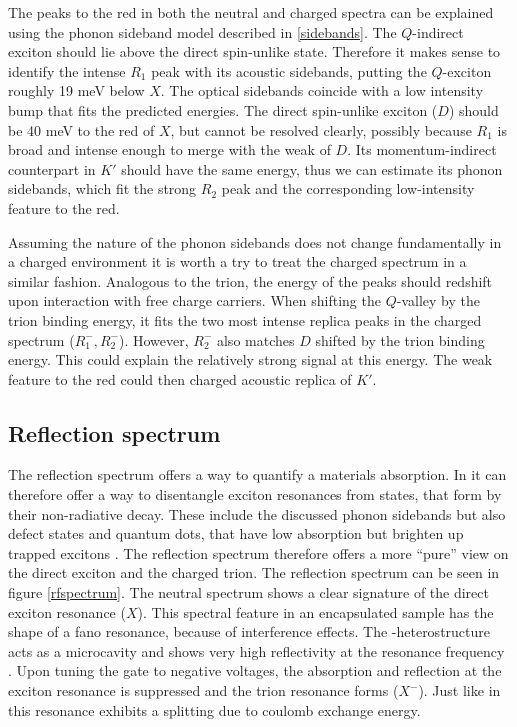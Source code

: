 The peaks to the red in both the neutral and charged spectra can be explained using the phonon sideband model described in \ref{sidebands}. The $Q$-indirect exciton should lie above the direct spin-unlike state. Therefore it makes sense to identify the intense $R_1$ peak with its acoustic sidebands, putting the $Q$-exciton roughly 19  meV below $X$. The optical sidebands coincide with a low intensity bump that fits the predicted energies. The direct spin-unlike exciton ($D$) should be 40 meV to the red of $X$, but cannot be resolved clearly, possibly because $R_1$ is broad and intense enough to merge with the weak \pl of $D$. Its momentum-indirect counterpart in $K'$ should have the same energy, thus we can estimate its phonon sidebands, which fit the strong $R_2$ peak and the corresponding low-intensity feature to the red.

Assuming the nature of the phonon sidebands does not change fundamentally in a charged environment it is worth a try to treat the charged spectrum in a similar fashion. Analogous to the trion, the energy of the peaks should redshift upon interaction with free charge carriers. When shifting the $Q$-valley by the trion binding energy, it fits the two most intense replica peaks in the charged spectrum ($R^-_1, R^-_2$). However, $R^-_2$ also matches $D$ shifted by the trion binding energy. This could explain the relatively strong signal at this energy. The weak feature to the red could then charged acoustic replica of $K'$. 

\subsection{Reflection spectrum}

The reflection spectrum offers a way to quantify a materials absorption. In \tmds it can therefore offer a way to disentangle exciton resonances from states, that form by their non-radiative decay. These include the discussed phonon sidebands but also defect states and quantum dots, that have low absorption but brighten up trapped excitons \cite{srivastava_optically_2015}. The reflection spectrum therefore offers a more ``pure'' view on the direct exciton and the charged trion.
The reflection spectrum can be seen in figure \ref{rfspectrum}. The neutral spectrum shows a clear signature of the direct exciton resonance ($X$). This spectral feature in an \hbng encapsulated sample has the shape of a fano resonance, because of interference effects. The \tmd-\hbng heterostructure acts as a microcavity and shows very high reflectivity at the resonance frequency \cite{scuri_large_2018}. Upon tuning the gate to negative voltages, the absorption and reflection at the exciton resonance is suppressed and the trion resonance forms ($X^-$). Just like in \pl this resonance exhibits a splitting due to coulomb exchange energy. 

